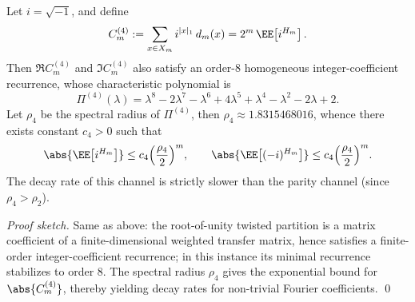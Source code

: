 \begin{conclusion}\label{con:xi-terminal-mod4-fourier-order8-recurrence}
Let \(i=\sqrt{-1}\), and define
\[
C_m^{(4)}:=\sum_{x\in X_m} i^{|x|_1}\,d_m(x)
=2^m\,\EE\!\left[i^{H_m}\right].
\]
Then \(\Re C_m^{(4)}\) and \(\Im C_m^{(4)}\) also satisfy an order-\(8\) homogeneous integer-coefficient recurrence, whose characteristic polynomial is
\[
\Pi^{(4)}(\lambda)=\lambda^8-2\lambda^7-\lambda^6+4\lambda^5+\lambda^4-\lambda^2-2\lambda+2.
\]
Let \(\rho_4\) be the spectral radius of \(\Pi^{(4)}\), then \(\rho_4\approx 1.8315468016\), whence there exists constant \(c_4>0\) such that
\[
\abs{\EE\!\left[i^{H_m}\right]}\le c_4\Bigl(\frac{\rho_4}{2}\Bigr)^m,
\qquad
\abs{\EE\!\left[(-i)^{H_m}\right]}\le c_4\Bigl(\frac{\rho_4}{2}\Bigr)^m.
\]
The decay rate of this channel is strictly slower than the parity channel (since \(\rho_4>\rho_2\)).
\end{conclusion}
\begin{proof}[Proof sketch]
Same as above: the root-of-unity twisted partition is a matrix coefficient of a finite-dimensional weighted transfer matrix, hence satisfies a finite-order integer-coefficient recurrence;
in this instance its minimal recurrence stabilizes to order \(8\).
The spectral radius \(\rho_4\) gives the exponential bound for \(\abs{C_m^{(4)}}\), thereby yielding decay rates for non-trivial Fourier coefficients. \qed
\end{proof}

